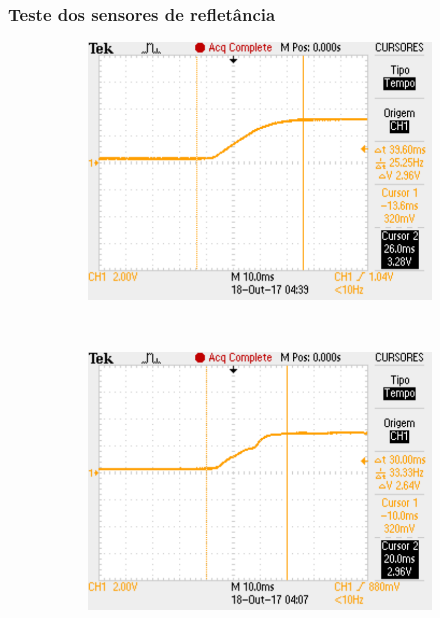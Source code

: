 \begin{frame}
\frametitle{Teste dos sensores de refletância}
 \begin{figure}[h]
     \centering
     \captionsetup{width=0.8\textwidth,font=footnotesize,textfont=bf}
     \begin{subfigure}[b]{0.3\textwidth}
 	\centering
         \includegraphics[width=\textwidth,height=\textheight,keepaspectratio]{figuras/TesteNew1mm.pdf}
         \caption{\centering \label{fig:TesteNew1mm}}
     \end{subfigure}
     ~
     \begin{subfigure}[b]{0.3\textwidth}
 	\centering
         \includegraphics[width=\textwidth,height=5\textheight,keepaspectratio]{figuras/TesteOld1mm.pdf}
         \caption{\centering \label{fig:TesteOld1mm}}
     \end{subfigure}
     

\end{figure}
\end{frame}
